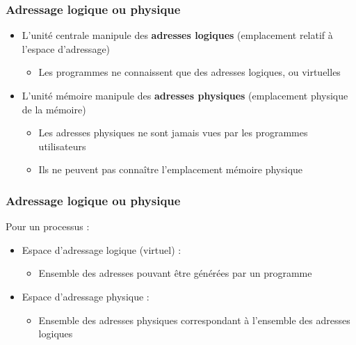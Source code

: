 \begin{frame}
\frametitle{Adressage logique ou physique}
\begin{itemize}
\item <1>L’unité centrale manipule des \textbf{adresses logiques} (emplacement relatif à l'espace d'adressage)
\begin{itemize}
\item Les programmes ne connaissent que des adresses logiques, ou virtuelles
\end{itemize}
\item <2>L’unité mémoire manipule des \textbf{adresses physiques} (emplacement physique de la mémoire)
\begin{itemize}
\item Les adresses physiques ne sont jamais vues par les programmes utilisateurs
\item Ils ne peuvent pas connaître l'emplacement mémoire physique
\end{itemize}
\end{itemize}
\end{frame}


\begin{frame}
\frametitle{Adressage logique ou physique}
Pour un processus :
\begin{itemize}
\item Espace d’adressage logique (virtuel) :
\begin{itemize}
\item Ensemble des adresses pouvant être générées par un programme
\end{itemize}
\item Espace d’adressage physique :
\begin{itemize}
\item Ensemble des adresses physiques correspondant à l'ensemble des adresses logiques
\end{itemize}
\end{itemize}
\end{frame}


